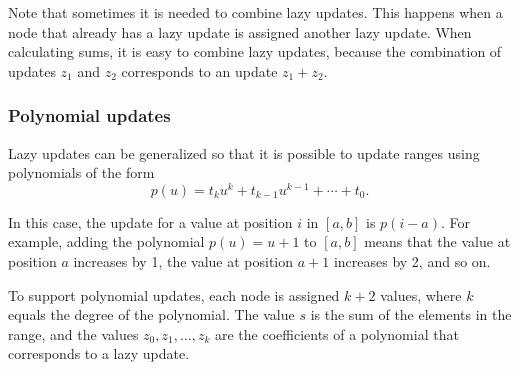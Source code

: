 \begin{center}
\end{center}

Note that sometimes it is needed to combine lazy updates.
This happens when a node that already has a lazy update
is assigned another lazy update.
When calculating sums, it is easy to combine lazy updates,
because the combination of updates $z_1$ and $z_2$
corresponds to an update $z_1+z_2$.

\subsubsection{Polynomial updates}

Lazy updates can be generalized so that it is
possible to update ranges using polynomials of the form
\[p(u) = t_k u^k + t_{k-1} u^{k-1} + \cdots + t_0.\]

In this case, the update for a value
at position $i$ in $[a,b]$ is $p(i-a)$.
For example, adding the polynomial $p(u)=u+1$
to $[a,b]$ means that the value at position $a$
increases by 1, the value at position $a+1$
increases by 2, and so on.

To support polynomial updates,
each node is assigned $k+2$ values,
where $k$ equals the degree of the polynomial.
The value $s$ is the sum of the elements in the range,
and the values $z_0,z_1,\ldots,z_k$ are the coefficients
of a polynomial that corresponds to a lazy update.

